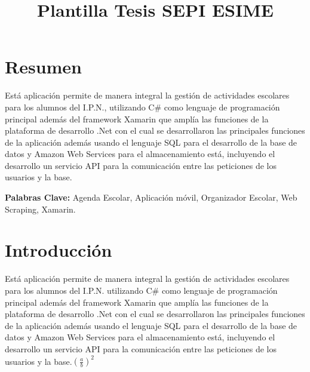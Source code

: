 \documentclass[10pt]{article}
\title{Plantilla Tesis SEPI ESIME}
\begin{document}
\nocite{IEEEreferencias:Ref1}
\nocite{IEEEreferencias:Ref2}
\nocite{IEEEreferencias:Ref3}
\nocite{IEEEreferencias:Ref4}
\nocite{IEEEreferencias:Ref5}
\nocite{IEEEreferencias:Ref6}
\nocite{IEEEreferencias:Ref7}
\nocite{IEEEreferencias:Ref8}
\nocite{IEEEreferencias:Ref9}
\nocite{IEEEreferencias:Ref10}
\nocite{IEEEreferencias:Ref11}
\nocite{IEEEreferencias:Ref12}
\nocite{IEEEreferencias:Ref13}
\nocite{IEEEreferencias:Ref14}
\nocite{IEEEreferencias:Ref15}

\cleardoublepage


\newpage																		
\tableofcontents 





\newpage
\section{Resumen}
\justify
Está aplicación permite de manera integral la gestión de actividades escolares para los alumnos del  I.P.N., utilizando C\# como lenguaje de programación principal además del framework Xamarin que amplía las funciones de la plataforma de desarrollo .Net con el cual se desarrollaron las principales funciones de la aplicación además usando el lenguaje SQL para el desarrollo de la base de datos  y Amazon Web Services para el almacenamiento está, incluyendo el desarrollo un servicio API para la comunicación entre las peticiones de los usuarios y la base.


\par\vspace{\baselineskip}
\justify
\textbf{Palabras Clave:} Agenda Escolar, Aplicación móvil, Organizador Escolar, Web Scraping, Xamarin.

\par\vspace{\baselineskip}



\section{Introducción}
\justify
Está aplicación permite de manera integral la gestión de actividades escolares para los alumnos del I.P.N. utilizando C# como lenguaje de programación principal además del framework Xamarin que amplía las funciones de la plataforma de desarrollo .Net con el cual se desarrollaron las principales funciones de la aplicación además usando el lenguaje SQL para el desarrollo de la base de datos  y Amazon Web Services para el almacenamiento está, incluyendo el desarrollo un servicio API para la comunicación entre las peticiones de los usuarios y la base.$(\frac{a}{b})^{2}$
\end{document}
